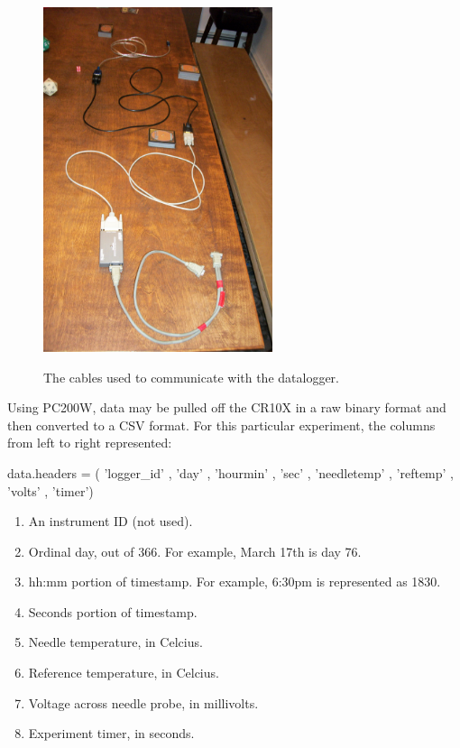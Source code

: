 \begin{figure}[h]
\centering
\includegraphics[width=0.6\textwidth]{fig/cable.jpg}
\label{fig:cable}
\caption{The cables used to communicate with the datalogger.}
\end{figure}

Using PC200W, data may be pulled off the CR10X in a raw binary format and then
converted to a CSV format. For this particular experiment, the columns from left
to right represented:

    data.headers = ( 'logger_id'
                   , 'day'
                   , 'hourmin'
                   , 'sec'
                   , 'needletemp'
                   , 'reftemp'
                   , 'volts'
                   , 'timer')


\begin{enumerate}
\item An instrument ID (not used).
\item Ordinal day, out of 366. For example, March 17th is day 76.
\item hh:mm portion of timestamp. For example, 6:30pm is represented as 1830.
\item Seconds portion of timestamp.
\item Needle temperature, in Celcius.
\item Reference temperature, in Celcius.
\item Voltage across needle probe, in millivolts.
\item Experiment timer, in seconds.
\end{enumerate}

